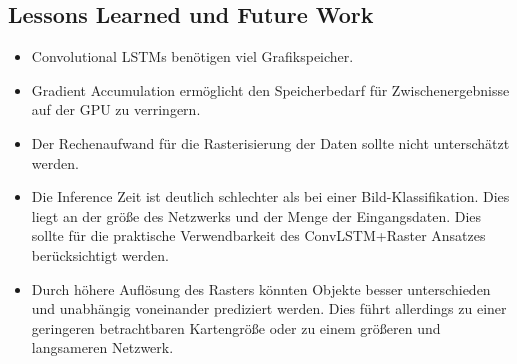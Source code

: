 \documentclass[12pt]{article}
\begin{document}
    \subsection{Lessons Learned und Future Work}
        \begin{itemize}
            \item Convolutional LSTMs benötigen viel Grafikspeicher.
            \item Gradient Accumulation ermöglicht den Speicherbedarf für Zwischenergebnisse auf der GPU zu verringern.
            \item Der Rechenaufwand für die Rasterisierung der Daten sollte nicht unterschätzt werden.
            \item Die Inference Zeit ist deutlich schlechter als bei einer Bild-Klassifikation. Dies liegt an der größe des Netzwerks und der Menge der Eingangsdaten. Dies sollte für die praktische Verwendbarkeit des ConvLSTM+Raster Ansatzes berücksichtigt werden. 
            \item Durch höhere Auflösung des Rasters könnten Objekte besser unterschieden und unabhängig voneinander prediziert werden. Dies führt allerdings zu einer geringeren betrachtbaren Kartengröße oder zu einem größeren und langsameren Netzwerk.
        \end{itemize}

{}

\end{document}
